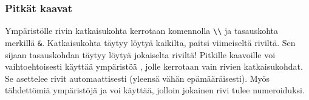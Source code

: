\begin{fframe}
    \frametitle{Pitkät kaavat}
    Ympäristölle  rivin katkaisukohta kerrotaan komennolla \lstinline-\\- ja tasauskohta merkillä \lstinline-&-. Katkaisukohta täytyy löytyä kaikilta, paitsi viimeiseltä riviltä. Sen sijaan tasauskohdan täytyy löytyä jokaiselta riviltä!
    \vaihto
    Pitkille kaavoille voi vaihtoehtoisesti käyttää ympäristöä , jolle kerrotaan vain rivien katkaisukohdat. Se asettelee rivit automaattisesti (yleensä vähän epämääräisesti).
    \vaihto
    Myös tähdettömiä ympäristöjä  ja  voi käyttää, jolloin jokainen rivi tulee numeroiduksi.
\end{fframe}

